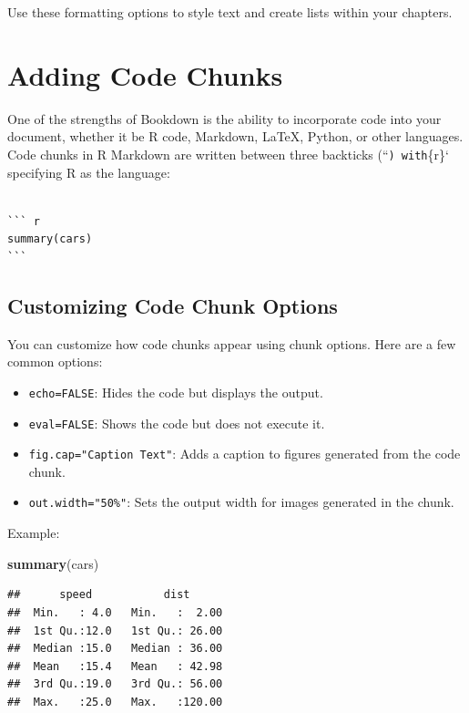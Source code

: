 \documentclass[
]{book}
\newenvironment{Shaded}{\begin{snugshade}}{\end{snugshade}}
\newcommand{\FunctionTok}[1]{\textcolor[rgb]{0.13,0.29,0.53}{\textbf{#1}}}
\newcommand{\NormalTok}[1]{#1}
\providecommand{\tightlist}{%
  \setlength{\itemsep}{0pt}\setlength{\parskip}{0pt}}
\theoremstyle{definition}
\theoremstyle{definition}
\theoremstyle{definition}
\theoremstyle{definition}
\theoremstyle{remark}
\begin{document}
Use these formatting options to style text and create lists within your chapters.

\section{Adding Code Chunks}\label{adding-code-chunks}

One of the strengths of Bookdown is the ability to incorporate code into your document, whether it be R code, Markdown, LaTeX, Python, or other languages. Code chunks in R Markdown are written between three backticks (``\texttt{)\ with}\{r\}` specifying R as the language:

\begin{verbatim}

``` r
summary(cars)
```
\end{verbatim}

\subsection{Customizing Code Chunk Options}\label{customizing-code-chunk-options}

You can customize how code chunks appear using chunk options. Here are a few common options:

\begin{itemize}
\tightlist
\item
  \texttt{echo=FALSE}: Hides the code but displays the output.
\item
  \texttt{eval=FALSE}: Shows the code but does not execute it.
\item
  \texttt{fig.cap="Caption\ Text"}: Adds a caption to figures generated from the code chunk.
\item
  \texttt{out.width="50\%"}: Sets the output width for images generated in the chunk.
\end{itemize}

Example:

\begin{Shaded}
\begin{Highlighting}[]
\FunctionTok{summary}\NormalTok{(cars)}
\end{Highlighting}
\end{Shaded}

\begin{verbatim}
##      speed           dist       
##  Min.   : 4.0   Min.   :  2.00  
##  1st Qu.:12.0   1st Qu.: 26.00  
##  Median :15.0   Median : 36.00  
##  Mean   :15.4   Mean   : 42.98  
##  3rd Qu.:19.0   3rd Qu.: 56.00  
##  Max.   :25.0   Max.   :120.00
\end{verbatim}
\end{document}
